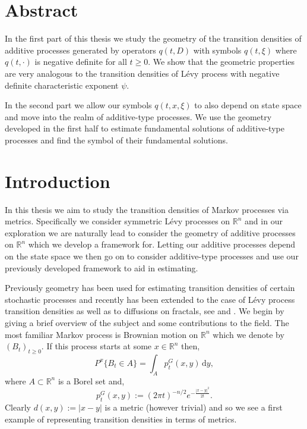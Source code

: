 \documentclass[a4paper, 12pt]{report}
\theoremstyle{remark}
\theoremstyle{definition}
\begin{document}
\newpage

\chapter*{Abstract}

In the first part of this thesis we study the geometry of the transition densities of additive processes generated by operators $q(t, D)$ with symbols $q(t, \xi)$ where $q(t, \cdot)$ is negative definite for all $t \ge 0$.  We show that the geometric properties are very analogous to the transition densities of L\'evy process with negative definite characteristic exponent $\psi$.

In the second part we allow our symbols $q(t, x, \xi)$ to also depend on state space and move into the realm of additive-type processes.  We use the geometry developed in the first half to estimate fundamental solutions of additive-type processes and find the symbol of their fundamental solutions.

\null\newpage

\hspace{0.5cm}

\newpage


\tableofcontents

\chapter*{Introduction}

In this thesis we aim to study the transition densities of Markov processes via metrics.  Specifically we consider symmetric L\'evy processes on $\mathbb{R}^n$ and in our exploration we are naturally lead to consider the geometry of additive processes on $\mathbb{R}^n$ which we develop a framework for.  Letting our additive processes depend on the state space we then go on to consider additive-type processes and use our previously developed framework to aid in estimating.

Previously geometry has been used for estimating transition densities of certain stochastic processes and recently has been extended to the case of L\'evy process transition densities as well as to diffusions on fractals, see \cite{m-stableEstimate} and \cite{45in8}.  We begin by giving a brief overview of the subject and some contributions to the field.  The most familiar Markov process is Brownian motion on $\mathbb{R}^n$ which we denote by $(B_t)_{t \ge 0}$.  If this process starts at some $x \in \mathbb{R}^n$ then,
$$
P^x\{B_t \in A\} = \int_Ap_t^G(x, y)\,\mathrm{d}y,
$$
where $A \subset \mathbb{R}^n$ is a Borel set and,
$$
p_t^G(x, y) := (2\pi t)^{-n/2}e^{-\frac{|x - y|^2}{2t}}.
$$
Clearly $d(x, y) := |x - y|$ is a metric (however trivial) and so we see a first example of representing transition densities in terms of metrics.
\end{document}
